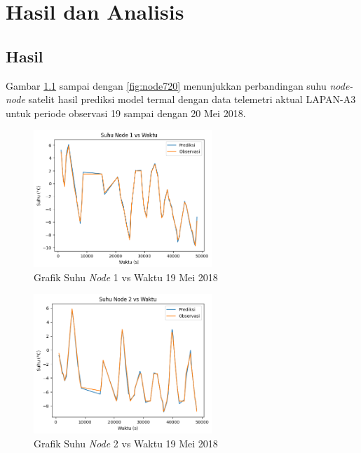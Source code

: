 \chapter{Hasil dan Analisis}

\section{Hasil}

Gambar \ref{fig:node119} sampai dengan \ref{fig:node720} menunjukkan perbandingan suhu \textit{node-node} satelit
hasil prediksi model termal dengan data telemetri aktual LAPAN-A3 untuk periode observasi 19 sampai dengan 20 Mei 2018.

\begin{figure}[H]
\setlength{}
\begin{center}
\includegraphics[width=0.6\textwidth]{fig/node1_temp_2018-05-19.png}
	\caption{Grafik Suhu \textit{Node} 1 vs Waktu 19 Mei 2018}
\label{fig:node119}
\end{center}
\end{figure}

\begin{figure}[H]
\setlength{}
\begin{center}
\includegraphics[width=0.6\textwidth]{fig/node2_temp_2018-05-19.png}
	\caption{Grafik Suhu \textit{Node} 2 vs Waktu 19 Mei 2018}
\label{fig:node219}
\end{center}
\end{figure}

